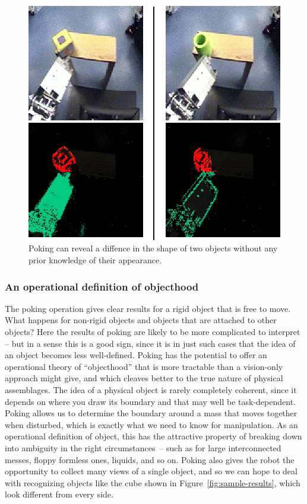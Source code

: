 \ifverbose
\begin{figure}[tbh]
\begin{center}
\includegraphics[width=\columnwidth]{cube-and-cylinder.eps}
\caption{ 
\label{fig:cube-and-cylinder}
%
  Poking can reveal a diffence in the shape of two objects without
  any prior knowledge of their appearance.
%
}
\end{center}
\end{figure}
\fi




\subsubsection*{An operational definition of objecthood}

The poking operation gives clear results for a rigid object that is
free to move.  What happens for non-rigid objects and objects that are
attached to other objects?  Here the results of poking are likely to
be more complicated to interpret -- but in a sense this is a good
sign, since it is in just such cases that the idea of an object
becomes less well-defined.  Poking has the potential to offer an
operational theory of ``objecthood'' that is more tractable than a
vision-only approach might give, and which cleaves better to the true
nature of physical assemblages.  The idea of a physical object is
rarely completely coherent, since it depends on where you draw its
boundary and that may well be task-dependent.  Poking allows us to
determine the boundary around a mass that moves together when
disturbed, which is exactly what we need to know for manipulation.  As
an operational definition of object, this has the attractive property
of breaking down into ambiguity in the right circumstances~-- such as
for large interconnected messes, floppy formless ones, liquids, and so
on.  Poking also gives the robot the opportunity
to collect many views of a single object, and so we can hope to deal
with recognizing objects like the cube shown in
Figure~\ref{fig:sample-results}, which look different from every side.


